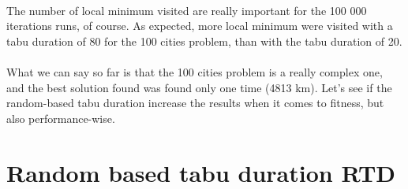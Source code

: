 \documentclass[12pt,oneside,a4paper]{article}
\begin{document}
\paragraph{}The number of local minimum visited are really important for the 100 000 iterations runs, 
of course. As expected, more local minimum were visited with a tabu duration of 80 for
the 100 cities problem, than with the tabu duration of 20.
\paragraph{}What we can say so far is that the 100 cities problem is a really complex one, and the best 
solution found was found only one time (4813 km). Let’s see if the random-based tabu duration
 increase the results when it comes to fitness, but also performance-wise.

\section{Random based tabu duration RTD}
\end{document}
